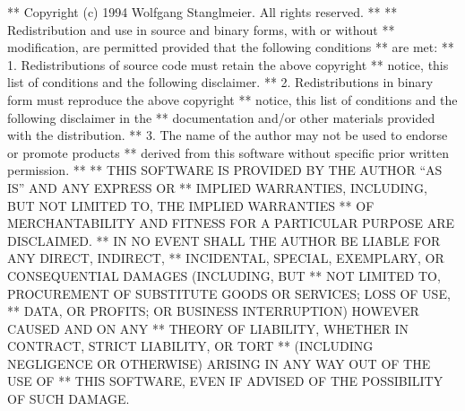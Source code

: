 \begin{copyrightEnv}
** Copyright (c) 1994 Wolfgang Stanglmeier.  All rights reserved.
**
** Redistribution and use in source and binary forms, with or without
** modification, are permitted provided that the following conditions
** are met:
** 1. Redistributions of source code must retain the above copyright
**    notice, this list of conditions and the following disclaimer.
** 2. Redistributions in binary form must reproduce the above copyright
**    notice, this list of conditions and the following disclaimer in the
**    documentation and/or other materials provided with the distribution.
** 3. The name of the author may not be used to endorse or promote products
**    derived from this software without specific prior written permission.
**
** THIS SOFTWARE IS PROVIDED BY THE AUTHOR ``AS IS'' AND ANY EXPRESS OR
** IMPLIED WARRANTIES, INCLUDING, BUT NOT LIMITED TO, THE IMPLIED WARRANTIES
** OF MERCHANTABILITY AND FITNESS FOR A PARTICULAR PURPOSE ARE DISCLAIMED.
** IN NO EVENT SHALL THE AUTHOR BE LIABLE FOR ANY DIRECT, INDIRECT,
** INCIDENTAL, SPECIAL, EXEMPLARY, OR CONSEQUENTIAL DAMAGES (INCLUDING, BUT
** NOT LIMITED TO, PROCUREMENT OF SUBSTITUTE GOODS OR SERVICES; LOSS OF USE,
** DATA, OR PROFITS; OR BUSINESS INTERRUPTION) HOWEVER CAUSED AND ON ANY
** THEORY OF LIABILITY, WHETHER IN CONTRACT, STRICT LIABILITY, OR TORT
** (INCLUDING NEGLIGENCE OR OTHERWISE) ARISING IN ANY WAY OUT OF THE USE OF
** THIS SOFTWARE, EVEN IF ADVISED OF THE POSSIBILITY OF SUCH DAMAGE.
\end{copyrightEnv}

